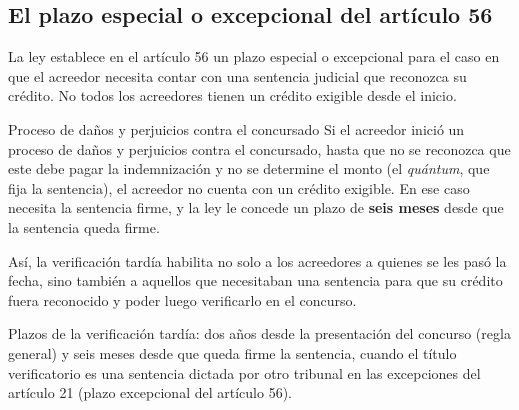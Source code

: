\documentclass[12pt,oneside]{book}
\begin{document}
\subsection{El plazo especial o excepcional del artículo 56}

La ley establece en el artículo 56 un plazo especial o excepcional para el caso en que el acreedor necesita contar con una sentencia judicial que reconozca su crédito. No todos los acreedores tienen un crédito exigible desde el inicio.

\begin{example}{Proceso de daños y perjuicios contra el concursado}
Si el acreedor inició un proceso de daños y perjuicios contra el concursado, hasta que no se reconozca que este debe pagar la indemnización y no se determine el monto (el \emph{quántum}, que fija la sentencia), el acreedor no cuenta con un crédito exigible. En ese caso necesita la sentencia firme, y la ley le concede un plazo de \textbf{seis meses} desde que la sentencia queda firme.
\end{example}

Así, la verificación tardía habilita no solo a los acreedores a quienes se les pasó la fecha, sino también a aquellos que necesitaban una sentencia para que su crédito fuera reconocido y poder luego verificarlo en el concurso.

\begin{important}
Plazos de la verificación tardía: dos años desde la presentación del concurso (regla general) y seis meses desde que queda firme la sentencia, cuando el título verificatorio es una sentencia dictada por otro tribunal en las excepciones del artículo 21 (plazo excepcional del artículo 56).
\end{important}
\end{document}
